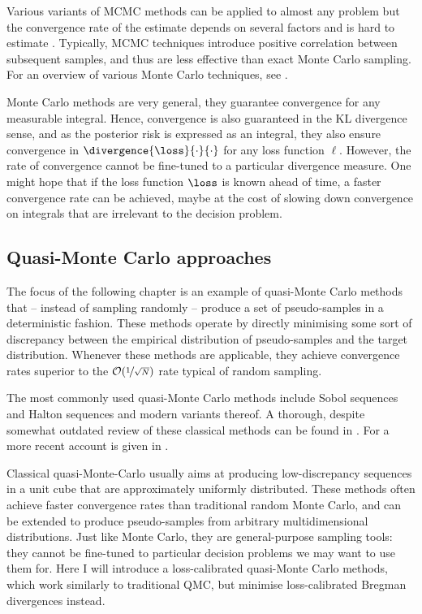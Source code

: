 Various variants of MCMC methods can be applied to almost any problem but the convergence rate of the estimate depends on several factors and is hard to estimate \citep{CowlesCarlin96}. Typically, MCMC techniques introduce positive correlation between subsequent samples, and thus are less effective than exact Monte Carlo sampling. For an overview of various Monte Carlo techniques, see \citep{Murray2007}.

Monte Carlo methods are very general, they guarantee convergence for any measurable integral. Hence, convergence is also guaranteed in the KL divergence sense, and as the posterior risk is expressed as an integral, they also ensure convergence in $\divergence{\loss}{\cdot}{\cdot}$ for any loss function $\ell$. However, the rate of convergence cannot be fine-tuned to a particular divergence measure. One might hope that if the loss function $\loss$ is known ahead of time, a faster convergence rate can be achieved, maybe at the cost of slowing down convergence on integrals that are irrelevant to the decision problem.

\subsection{Quasi-Monte Carlo approaches}

The focus of the following chapter is an example of quasi-Monte Carlo methods that -- instead of sampling randomly -- produce a set of pseudo-samples in a deterministic fashion. These methods operate by directly minimising some sort of discrepancy between the empirical distribution of pseudo-samples and the target distribution. Whenever these methods are applicable, they achieve convergence rates superior to the $\mathcal{O}(\nicefrac{1}{\sqrt{N}})$ rate typical of random sampling.

The most commonly used quasi-Monte Carlo methods include Sobol sequences \citep{Sobol1967,Sobol1998} and Halton sequences \citep{Halton1964} and modern variants thereof. A thorough, despite somewhat outdated review of these classical methods can be found in \citep{Niederreiter1992}. For a more recent account is given in \citep{Lemieux2009}.

Classical quasi-Monte-Carlo usually aims at producing low-discrepancy sequences in a unit cube that are approximately uniformly distributed. These methods often achieve faster convergence rates than traditional random Monte Carlo, and can be extended to produce pseudo-samples from arbitrary multidimensional distributions. Just like Monte Carlo, they are general-purpose sampling tools: they cannot be fine-tuned to particular decision problems we may want to use them for. Here I will introduce a loss-calibrated quasi-Monte Carlo methods, which work similarly to traditional QMC, but minimise loss-calibrated Bregman divergences instead.

